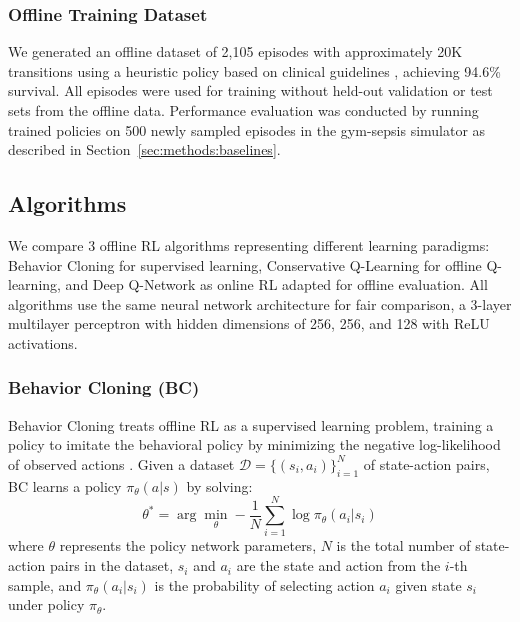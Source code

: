 \subsubsection{Offline Training Dataset}

We generated an offline dataset of 2,105 episodes with approximately 20K transitions using a heuristic policy based on clinical guidelines \citep{rhodes2017ssc, seymour2017sepsis_criteria}, achieving 94.6\% survival. All episodes were used for training without held-out validation or test sets from the offline data. Performance evaluation was conducted by running trained policies on 500 newly sampled episodes in the gym-sepsis simulator as described in Section~\ref{sec:methods:baselines}.

\subsection{Algorithms}\label{sec:methods:algos}

We compare 3 offline RL algorithms representing different learning paradigms: Behavior Cloning for supervised learning, Conservative Q-Learning for offline Q-learning, and Deep Q-Network as online RL adapted for offline evaluation. All algorithms use the same neural network architecture for fair comparison, a 3-layer multilayer perceptron with hidden dimensions of 256, 256, and 128 with ReLU activations.

\subsubsection{Behavior Cloning (BC)}

Behavior Cloning treats offline RL as a supervised learning problem, training a policy to imitate the behavioral policy by minimizing the negative log-likelihood of observed actions \citep{pomerleau1991bc}. Given a dataset $\mathcal{D} = \{(s_i, a_i)\}_{i=1}^N$ of state-action pairs, BC learns a policy $\pi_{\theta}(a|s)$ by solving:
\begin{equation}
\theta^* = \arg\min_{\theta} -\frac{1}{N} \sum_{i=1}^N \log \pi_{\theta}(a_i | s_i)
\label{eq:bc}
\end{equation}
where $\theta$ represents the policy network parameters, $N$ is the total number of state-action pairs in the dataset, $s_i$ and $a_i$ are the state and action from the $i$-th sample, and $\pi_{\theta}(a_i | s_i)$ is the probability of selecting action $a_i$ given state $s_i$ under policy $\pi_{\theta}$.

